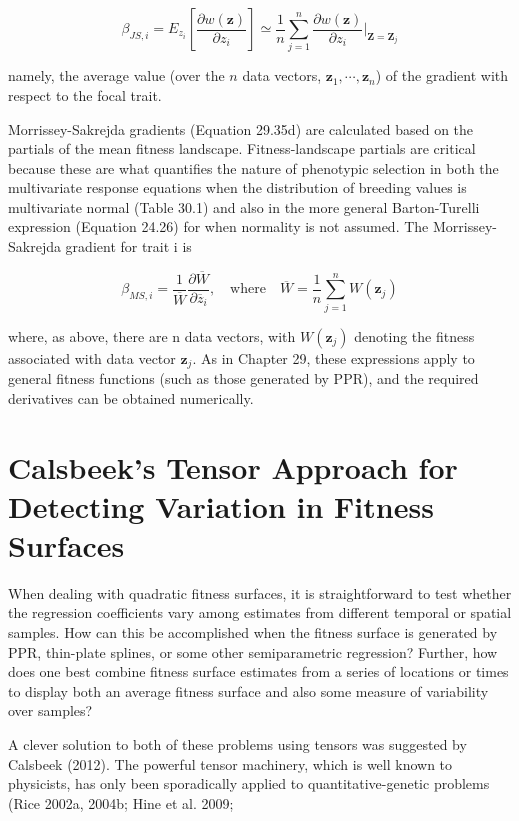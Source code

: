 \documentclass{article}
\begin{document}
\begin{equation}
\beta_{JS,i}=E_{z_{i}}\left[\frac{\partial w(\mathbf{z})}{\partial z_{i}}\right]\simeq\frac{1}{n}\sum_{j=1}^{n}\frac{\partial w(\mathbf{z})}{\partial z_{i}}\bigg|_{\mathbf{Z}=\mathbf{Z}_{j}}
\tag{30.30a}
\label{eq:30_30a}
\end{equation}

namely, the average value (over the $n$ data vectors, $\mathbf{z}_{1},\cdots,\mathbf{z}_{n}$) of the gradient with respect to the focal trait.

Morrissey-Sakrejda gradients (Equation 29.35d) are calculated based on the partials of the mean fitness landscape. Fitness-landscape partials are critical because these are what quantifies the nature of phenotypic selection in both the multivariate response equations when the distribution of breeding values is multivariate normal (Table 30.1) and also in the more general Barton-Turelli expression (Equation 24.26) for when normality is not assumed. The Morrissey-Sakrejda gradient for trait i is

\begin{equation}
\beta_{M S,i}=\frac{1}{\overline{W}}\frac{\partial\overline{W}}{\partial\overline{z}_{i}},\quad\mathrm{w h e r e}\quad\overline{W}=\frac{1}{n}\sum_{j=1}^{n}W(\mathbf{z}_{j})
\tag{30.30b}
\label{eq:30_30b}
\end{equation}

where, as above, there are n data vectors, with  $ W(\mathbf{z}_j) $ denoting the fitness associated with data vector  $ \mathbf{z}_j $. As in Chapter 29, these expressions apply to general fitness functions (such as those generated by PPR), and the required derivatives can be obtained numerically.

\section{Calsbeek's Tensor Approach for Detecting Variation in Fitness Surfaces}
When dealing with quadratic fitness surfaces, it is straightforward to test whether the regression coefficients vary among estimates from different temporal or spatial samples. How can this be accomplished when the fitness surface is generated by PPR, thin-plate splines, or some other semiparametric regression? Further, how does one best combine fitness surface estimates from a series of locations or times to display both an average fitness surface and also some measure of variability over samples?

A clever solution to both of these problems using tensors was suggested by Calsbeek (2012). The powerful tensor machinery, which is well known to physicists, has only been sporadically applied to quantitative-genetic problems (Rice 2002a, 2004b; Hine et al. 2009;
\end{document}
